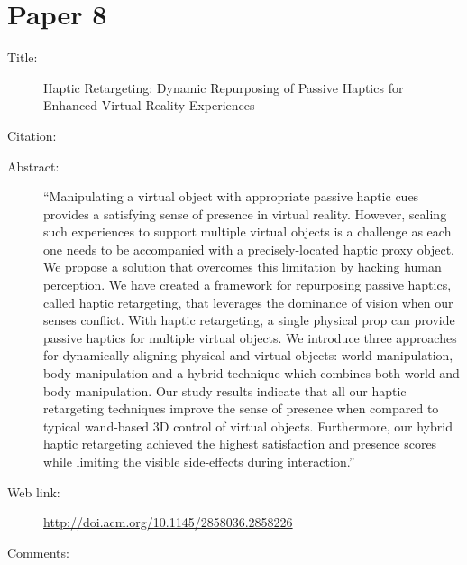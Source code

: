\documentclass{scrartcl}
\begin{document}
	\section*{Paper 8}
	\begin{description}
		\item[Title:] Haptic Retargeting: Dynamic Repurposing of Passive Haptics for Enhanced Virtual Reality Experiences
		\item[Citation:] \cite{Azmandian}
		\item[Abstract:] ``Manipulating a virtual object with appropriate passive haptic cues provides a satisfying sense of presence in virtual reality. However, scaling such experiences to support multiple virtual objects is a challenge as each one needs to be accompanied with a precisely-located haptic proxy object. We propose a solution that overcomes this limitation by hacking human perception. We have created a framework for repurposing passive haptics, called haptic retargeting, that leverages the dominance of vision when our senses conflict. With haptic retargeting, a single physical prop can provide passive haptics for multiple virtual objects. We introduce three approaches for dynamically aligning physical and virtual objects: world manipulation, body manipulation and a hybrid technique which combines both world and body manipulation. Our study results indicate that all our haptic retargeting techniques improve the sense of presence when compared to typical wand-based 3D control of virtual objects. Furthermore, our hybrid haptic retargeting achieved the highest satisfaction and presence scores while limiting the visible side-effects during interaction.''
		\item[Web link:] \url{http://doi.acm.org/10.1145/2858036.2858226}
		\item[Comments:]
	\end{description}
	
\end{document}
